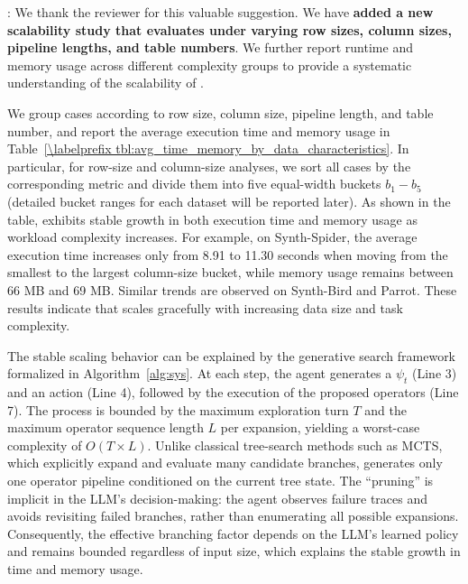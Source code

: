 






: 
We thank the reviewer for this valuable suggestion. We have \textbf{added a new scalability study that evaluates \sys under varying row sizes, column sizes, pipeline lengths, and table numbers}. We further {report runtime and memory usage across different complexity groups} to provide a systematic understanding of the scalability of \sys.

We group cases according to row size, column size, pipeline length, and table number, and report the average execution time and memory usage in Table~\ref{\labelprefix tbl:avg_time_memory_by_data_characteristics}. 
In particular, for row-size and column-size analyses, we sort all cases by the corresponding metric and divide them into five equal-width buckets $b_1 - b_5$ (detailed bucket ranges for each dataset will be reported later).
As shown in the table, \sys exhibits stable growth in both execution time and memory usage as workload complexity increases. For example, on Synth-Spider, the average execution time increases only from 8.91 to 11.30 seconds when moving from the smallest to the largest column-size bucket, while memory usage remains between 66 MB and 69 MB. Similar trends are observed on Synth-Bird and Parrot. These results indicate that \sys scales gracefully with increasing data size and task complexity.

The stable scaling behavior can be explained by the generative search framework formalized in Algorithm~\ref{alg:sys}. At each step, the agent generates a  $\psi_t$ (Line 3) and an  action (Line 4), followed by the execution of the proposed operators (Line 7). The process is bounded by the maximum exploration turn $T$ and the maximum operator sequence length $L$ per expansion, yielding a worst-case complexity of $O(T \times L)$. Unlike classical tree-search methods such as MCTS, which explicitly expand and evaluate many candidate branches, \sys generates only one operator pipeline conditioned on the current tree state. The ``pruning'' is implicit in the LLM's decision-making: the agent observes failure traces and avoids revisiting failed branches, rather than enumerating all possible expansions. Consequently, the effective branching factor depends on the LLM's learned policy and remains bounded regardless of input size, which explains the stable growth in time and memory usage.

